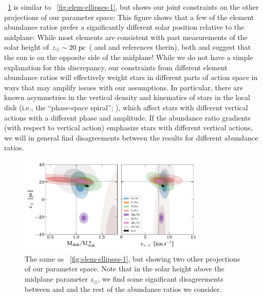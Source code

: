 \documentclass[modern]{aastex63}
\begin{document}
\figurename~\ref{fig:elem-ellipses-2} is similar to
\figurename~\ref{fig:elem-ellipses-1}, but shows our joint constraints on the
other projections of our parameter space:
This figure shows that a few of the element abundance ratios prefer a
significantly different solar position relative to the midplane:
While most elements are consistent with past measurements of the solar height of
$z_\odot \sim 20~\mathrm{pc}$ (\citealt{Bennett:2019} and \citealt{Bland-Hawthorn:2016}
and references therin), both  and  suggest
that the sun is on the opposite side of the midplane!
While we do not have a simple explanation for this discrepancy, our constraints
from different element abundance ratios will effectively weight stars in
different parts of action space in ways that may amplify issues with our
assumptions.
In particular, there are known asymmetries in the vertical density and
kinematics of stars in the local disk (i.e., the ``phase-space spiral'';
\citealt{Antoja:2018}), which affect stars with different vertical actions with
a different phase and amplitude.
If the abundance ratio gradients (with respect to vertical action) emphasize
stars with different vertical actions, we will in general find disagreements
between the results for different abundance ratios.



\begin{figure}[!tp]
  \begin{mdframed}
    \color{captiongray}
  \begin{center}
  \includegraphics[width=0.8\textwidth]{M-z-vz-z-error-ellipses.pdf}
  \end{center}
  \caption{%
  The same as \figurename~\ref{fig:elem-ellipses-1}, but showing two other
  projections of our parameter space.
  Note that in the solar height above the midplane parameter $z_\odot$, we find
  some significant disagreements between  and
   and the rest of the abundance ratios we consider.
  \label{fig:elem-ellipses-2}
  }
  \end{mdframed}
\end{figure}
\end{document}
